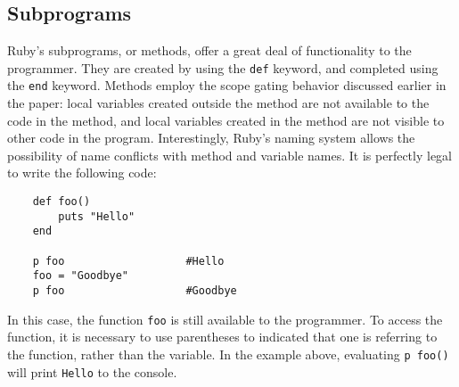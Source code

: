 \documentclass[12pt]{article}
\begin{document}
\subsection{Subprograms}
Ruby's subprograms, or methods, offer a great deal of functionality to the programmer. They are created by using the \verb|def| keyword, and completed using the \verb|end| keyword. Methods employ the scope gating behavior discussed earlier in the paper: local variables created outside the method are not available to the code in the method, and local variables created in the method are not visible to other code in the program\cite{calvin_labs}. Interestingly, Ruby's naming system allows the possibility of name conflicts with method and variable names. It is perfectly legal to write the following code:
\begin{lstlisting}
    def foo()  
        puts "Hello"
    end
    
    p foo                   #Hello 
    foo = "Goodbye"
    p foo                   #Goodbye
\end{lstlisting}
In this case, the function \verb|foo| is still available to the programmer. To access the function, it is necessary to use parentheses to indicated that one is referring to the function, rather than the variable. In the example above, evaluating \verb|p foo()| will print \verb|Hello| to the console\cite{darko}.
\end{document}
